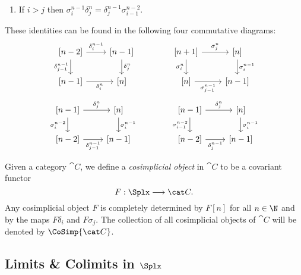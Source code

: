 \begin{corollary}
\begin{enumerate}[(1)]
\item If \(i > j\) then
  \(\sigma_i^{n-1} \delta_j^n = \delta_j^{n-1} \sigma_{i-1}^{n-2}\).
\end{enumerate}
These identities can be found in the following four commutative diagrams:
%
\begin{equation*}
  \begin{tikzcd}
  {[n-2]} \ar[r, "\delta_i^{n-1}"] \ar[d, "\delta_{j-1}^{n-1}"']
  &{[n-1]} \ar[d, "\delta_j^n"] \\
  {[n-1]} \ar[r, "\delta_i^n"'] &{[n]}
  \end{tikzcd}
  \qquad
  \qquad
  \begin{tikzcd}
  {[n+1]} \ar[r, "\sigma_j^n"] \ar[d, "\sigma_i^n"']
  &{[n]} \ar[d, "\sigma_i^{n-1}"] \\
  {[n]} \ar[r, "\sigma_{j-1}^{n-1}"'] &{[n-1]}
  \end{tikzcd}
\end{equation*}
%
\begin{equation*}
  \begin{tikzcd}
  {[n - 1]} \ar[r, "\delta_j^n"] \ar[d, "\sigma_i^{n-2}"']
  &{[n]} \ar[d, "\sigma_i^{n-1}"] \\
  {[n-2]} \ar[r, "\delta_{j-1}^{n-1}"'] &{[n-1]}
  \end{tikzcd}
  \qquad
  \qquad
  \begin{tikzcd}
  {[n - 1]} \ar[r, "\delta_j^n"] \ar[d, "\sigma_{i-1}^{n-2}"']
  &{[n]} \ar[d, "\sigma_i^{n-1}"] \\
  {[n-2]} \ar[r, "\delta_j^{n-1}"'] &{[n-1]}
  \end{tikzcd}
\end{equation*}
\end{corollary}

\begin{definition}
\label{def:cosimp-obj}
Given a category \(\cat C\), we define a \emph{cosimplicial object} in
\(\cat C\) to be a covariant functor
\[
F: \Splx \longrightarrow \cat C.
\]
Any cosimplicial object \(F\) is completely determined by \(F [n]\) for all
\(n \in \N\) and by the maps \(F \delta_i\) and \(F \sigma_j\). The collection
of all cosimplicial objects of \(\cat C\) will be denoted by
\(\CoSimp{\cat C}\).
\end{definition}

\subsection{Limits \& Colimits in \texorpdfstring{\(\Splx\)}{Delta}}

